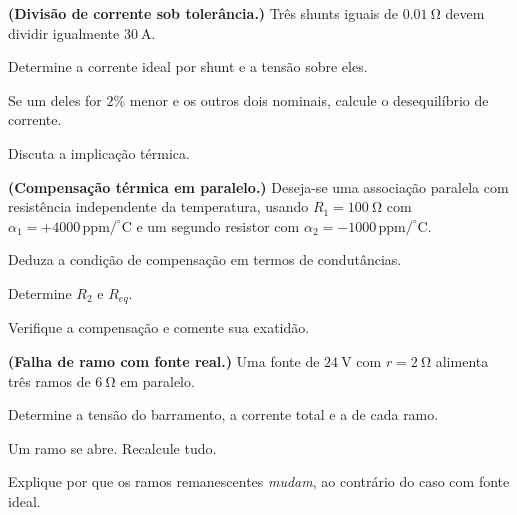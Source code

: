 \begin{questao}[4]{}

\textbf{(Divisão de corrente sob tolerância.)} Três shunts iguais de
$\SI{0.01}{\ohm}$ devem dividir igualmente $\SI{30}{\ampere}$.
\begin{itensq}
\item Determine a corrente ideal por shunt e a tensão sobre eles.
\item Se um deles for $2\%$ menor e os outros dois nominais, calcule o
      desequilíbrio de corrente.
\item Discuta a implicação térmica.
\end{itensq}


\end{questao}
\begin{questao}[4]{}

\textbf{(Compensação térmica em paralelo.)} Deseja-se uma associação paralela
com resistência independente da temperatura, usando
$R_1=\SI{100}{\ohm}$ com $\alpha_1=+4000\,\mathrm{ppm/^{\circ}C}$ e um segundo
resistor com $\alpha_2=-1000\,\mathrm{ppm/^{\circ}C}$.
\begin{itensq}
\item Deduza a condição de compensação em termos de condutâncias.
\item Determine $R_2$ e $R_{eq}$.
\item Verifique a compensação e comente sua exatidão.
\end{itensq}


\end{questao}
\begin{questao}[4]{}

\textbf{(Falha de ramo com fonte real.)} Uma fonte de $\SI{24}{\volt}$ com
$r=\SI{2}{\ohm}$ alimenta três ramos de $\SI{6}{\ohm}$ em paralelo.
\begin{itensq}
\item Determine a tensão do barramento, a corrente total e a de cada ramo.
\item Um ramo se abre. Recalcule tudo.
\item Explique por que os ramos remanescentes \emph{mudam}, ao contrário do
      caso com fonte ideal.
\end{itensq}


\end{questao}
